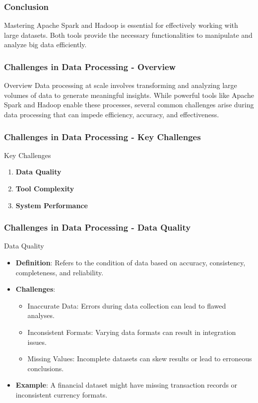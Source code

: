 \documentclass[aspectratio=169]{beamer}
\begin{document}
\begin{frame}[fragile]
    \frametitle{Conclusion}
    Mastering Apache Spark and Hadoop is essential for effectively working with large datasets. Both tools provide the necessary functionalities to manipulate and analyze big data efficiently.
\end{frame}

\begin{frame}[fragile]
    \frametitle{Challenges in Data Processing - Overview}
    \begin{block}{Overview}
        Data processing at scale involves transforming and analyzing large volumes of data to generate meaningful insights.
        While powerful tools like Apache Spark and Hadoop enable these processes, several common challenges arise during data processing that can impede efficiency, accuracy, and effectiveness.
    \end{block}
\end{frame}

\begin{frame}[fragile]
    \frametitle{Challenges in Data Processing - Key Challenges}
    \begin{block}{Key Challenges}
        \begin{enumerate}
            \item \textbf{Data Quality}
            \item \textbf{Tool Complexity}
            \item \textbf{System Performance}
        \end{enumerate}
    \end{block}
\end{frame}

\begin{frame}[fragile]
    \frametitle{Challenges in Data Processing - Data Quality}
    \begin{block}{Data Quality}
        \begin{itemize}
            \item \textbf{Definition}: Refers to the condition of data based on accuracy, consistency, completeness, and reliability.
            \item \textbf{Challenges}:
            \begin{itemize}
                \item Inaccurate Data: Errors during data collection can lead to flawed analyses.
                \item Inconsistent Formats: Varying data formats can result in integration issues.
                \item Missing Values: Incomplete datasets can skew results or lead to erroneous conclusions.
            \end{itemize}
            \item \textbf{Example}: A financial dataset might have missing transaction records or inconsistent currency formats.
        \end{itemize}
    \end{block}
\end{frame}
\end{document}
